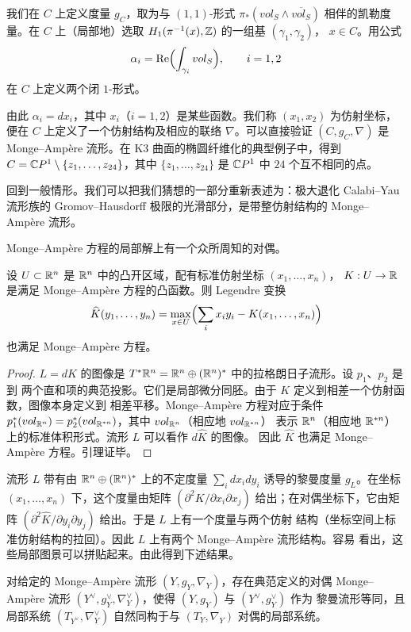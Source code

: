 我们在 $C$ 上定义度量 $g_C$，取为与 $(1,1)$-形式 $\pi_*(vol_S\wedge\overline{vol_S})$
相伴的凯勒度量。在 $C$ 上（局部地）选取 $H_1(\pi^{-1}(x),\mathbb{Z})$ 的一组基 $(\gamma_1,\gamma_2)$，
$x\in C$。用公式
\[
  \alpha_i=\mathrm{Re}\Bigl(\int_{\gamma_i}vol_S\Bigr),\qquad i=1,2
\]
在 $C$ 上定义两个闭 $1$-形式。

由此 $\alpha_i=dx_i$，其中 $x_i$（$i=1,2$）是某些函数。我们称 $(x_1,x_2)$ 为仿射坐标，
便在 $C$ 上定义了一个仿射结构及相应的联络 $\nabla$。可以直接验证 $(C,g_C,\nabla)$ 是
Monge--Ampère 流形。在 K3 曲面的椭圆纤维化的典型例子中，得到
$C=\mathbb{C} P^1\setminus\{z_1,\dots,z_{24}\}$，其中 $\{z_1,\dots,z_{24}\}$ 是 $\mathbb{C} P^1$ 中
$24$ 个互不相同的点。

回到一般情形。我们可以把我们猜想的一部分重新表述为：极大退化 Calabi--Yau 流形族的
Gromov--Hausdorff 极限的光滑部分，是带整仿射结构的 Monge--Ampère 流形。

Monge--Ampère 方程的局部解上有一个众所周知的对偶。

\begin{lmm}
设 $U\subset\mathbb{R}^n$ 是 $\mathbb{R}^n$ 中的凸开区域，配有标准仿射坐标 $(x_1,\dots,x_n)$，
$K:U\to\mathbb{R}$ 是满足 Monge--Ampère 方程的凸函数。则 Legendre 变换
\[
  \widehat K(y_1,\dots,y_n)
  =\max_{x\in U}\Bigl(\sum_i x_iy_i-K(x_1,\dots,x_n)\Bigr)
\]
也满足 Monge--Ampère 方程。
\end{lmm}

\begin{proof}
$L=dK$ 的图像是 $T^*\mathbb{R}^n=\mathbb{R}^n\oplus(\mathbb{R}^n)^*$ 中的拉格朗日子流形。设 $p_1$、$p_2$ 是到
两个直和项的典范投影。它们是局部微分同胚。由于 $K$ 定义到相差一个仿射函数，图像本身定义到
相差平移。Monge--Ampère 方程对应于条件
$p_1^*(vol_{\mathbb{R}^n})=p_2^*(vol_{\mathbb{R}^{*n}})$，其中 $vol_{\mathbb{R}^n}$（相应地 $vol_{\mathbb{R}^{*n}}$）
表示 $\mathbb{R}^n$（相应地 $\mathbb{R}^{*n}$）上的标准体积形式。流形 $L$ 可以看作 $d\widehat K$ 的图像。
因此 $\widehat K$ 也满足 Monge--Ampère 方程。引理证毕。
\end{proof}

流形 $L$ 带有由 $\mathbb{R}^n\oplus(\mathbb{R}^n)^*$ 上的不定度量 $\sum_i dx_idy_i$ 诱导的黎曼度量
$g_L$。在坐标 $(x_1,\dots,x_n)$ 下，这个度量由矩阵
$(\partial^2K/\partial x_i\partial x_j)$ 给出；在对偶坐标下，它由矩阵
$(\partial^2\widehat K/\partial y_i\partial y_j)$ 给出。于是 $L$ 上有一个度量与两个仿射
结构（坐标空间上标准仿射结构的拉回）。因此 $L$ 上有两个 Monge--Ampère 流形结构。容易
看出，这些局部图景可以拼贴起来。由此得到下述结果。

\begin{prp}
对给定的 Monge--Ampère 流形 $(Y,g_Y,\nabla_Y)$，存在典范定义的对偶 Monge--Ampère 流形
$(Y^{\vee},g^{\vee}_Y,\nabla^{\vee}_Y)$，使得 $(Y,g_Y)$ 与 $(Y^{\vee},g^{\vee}_Y)$ 作为
黎曼流形等同，且局部系统 $(T_{Y^{\vee}},\nabla^{\vee}_Y)$ 自然同构于与 $(T_Y,\nabla_Y)$
对偶的局部系统。
\end{prp}

